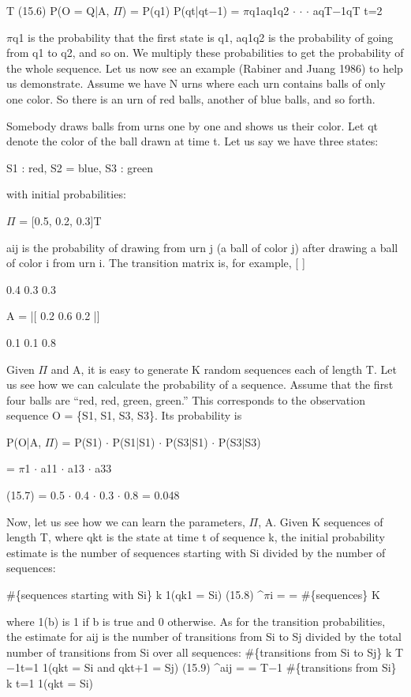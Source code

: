 T (15.6) P(O = Q|A, $\Pi$) = P(q1) P(qt|qt$-$1) = $\pi$q1aq1q2 $\cdot$ $\cdot$ $\cdot$ aqT$-$1qT t=2

$\pi$q1 is the probability that the first state is q1, aq1q2 is the probability of going from q1 to q2, and so on. We multiply these probabilities to get the probability of the whole sequence. Let us now see an example (Rabiner and Juang 1986) to help us demonstrate. Assume we have N urns where each urn contains balls of only one color. So there is an urn of red balls, another of blue balls, and so forth.

Somebody draws balls from urns one by one and shows us their color. Let qt denote the color of the ball drawn at time t. Let us say we have three states:

S1 : red, S2 = blue, S3 : green

with initial probabilities:

$\Pi$ = [0.5, 0.2, 0.3]T

aij is the probability of drawing from urn j (a ball of color j) after drawing a ball of color i from urn i. The transition matrix is, for example, [ ]

0.4 0.3 0.3

A = |[ 0.2 0.6 0.2 |]

0.1 0.1 0.8

Given $\Pi$ and A, it is easy to generate K random sequences each of length T. Let us see how we can calculate the probability of a sequence. Assume that the first four balls are “red, red, green, green.” This corresponds to the observation sequence O = \{S1, S1, S3, S3\}. Its probability is

P(O|A, $\Pi$) = P(S1) $\cdot$ P(S1|S1) $\cdot$ P(S3|S1) $\cdot$ P(S3|S3)

= $\pi$1 $\cdot$ a11 $\cdot$ a13 $\cdot$ a33

(15.7) = 0.5 $\cdot$ 0.4 $\cdot$ 0.3 $\cdot$ 0.8 = 0.048

Now, let us see how we can learn the parameters, $\Pi$, A. Given K sequences of length T, where qkt is the state at time t of sequence k, the initial probability estimate is the number of sequences starting with Si divided by the number of sequences:

\#\{sequences starting with Si\} k 1(qk1 = Si) (15.8) \textasciicircum{}$\pi$i = = \#\{sequences\} K

where 1(b) is 1 if b is true and 0 otherwise. As for the transition probabilities, the estimate for aij is the number of transitions from Si to Sj divided by the total number of transitions from Si over all sequences: \#\{transitions from Si to Sj\} k T$-$1t=1 1(qkt = Si and qkt+1 = Sj) (15.9) \textasciicircum{}aij = = T$-$1 \#\{transitions from Si\} k t=1 1(qkt = Si)

